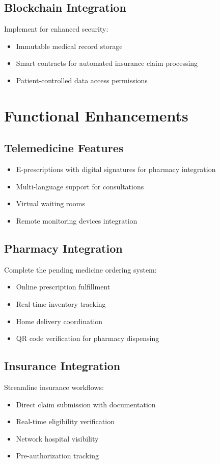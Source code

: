 \subsection{Blockchain Integration}
Implement for enhanced security:
\begin{itemize}
    \item Immutable medical record storage
    \item Smart contracts for automated insurance claim processing
    \item Patient-controlled data access permissions
\end{itemize}

\section{Functional Enhancements}

\subsection{Telemedicine Features}
\begin{itemize}
    \item E-prescriptions with digital signatures for pharmacy integration
    \item Multi-language support for consultations
    \item Virtual waiting rooms
    \item Remote monitoring devices integration
\end{itemize}

\subsection{Pharmacy Integration}
Complete the pending medicine ordering system:
\begin{itemize}
    \item Online prescription fulfillment
    \item Real-time inventory tracking
    \item Home delivery coordination
    \item QR code verification for pharmacy dispensing
\end{itemize}

\subsection{Insurance Integration}
Streamline insurance workflows:
\begin{itemize}
    \item Direct claim submission with documentation
    \item Real-time eligibility verification
    \item Network hospital visibility
    \item Pre-authorization tracking
\end{itemize}

